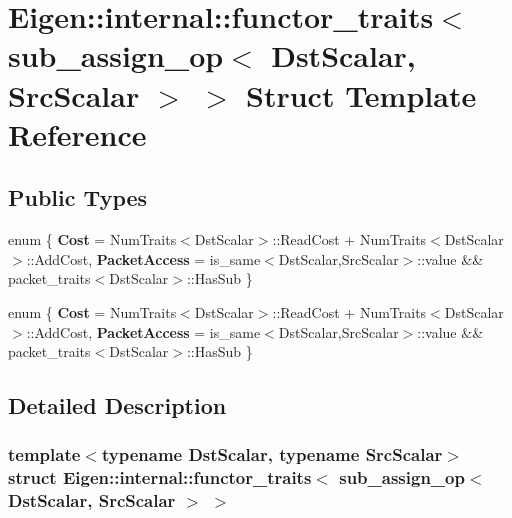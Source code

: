 \hypertarget{struct_eigen_1_1internal_1_1functor__traits_3_01sub__assign__op_3_01_dst_scalar_00_01_src_scalar_01_4_01_4}{}\section{Eigen\+:\+:internal\+:\+:functor\+\_\+traits$<$ sub\+\_\+assign\+\_\+op$<$ Dst\+Scalar, Src\+Scalar $>$ $>$ Struct Template Reference}
\label{struct_eigen_1_1internal_1_1functor__traits_3_01sub__assign__op_3_01_dst_scalar_00_01_src_scalar_01_4_01_4}
\subsection*{Public Types}
\begin{DoxyCompactItemize}
\item 
\mbox{\label{struct_eigen_1_1internal_1_1functor__traits_3_01sub__assign__op_3_01_dst_scalar_00_01_src_scalar_01_4_01_4_a765a81f91d21667f6bb16c7ce2a338ab}} 
enum \{ {\bfseries Cost} = Num\+Traits$<$Dst\+Scalar$>$\+:\+:Read\+Cost + Num\+Traits$<$Dst\+Scalar$>$\+:\+:Add\+Cost, 
{\bfseries Packet\+Access} = is\+\_\+same$<$Dst\+Scalar,Src\+Scalar$>$\+:\+:value \&\& packet\+\_\+traits$<$Dst\+Scalar$>$\+:\+:Has\+Sub
 \}
\item 
\mbox{\label{struct_eigen_1_1internal_1_1functor__traits_3_01sub__assign__op_3_01_dst_scalar_00_01_src_scalar_01_4_01_4_a4216eff6941d2e824ca91f11f4c5d14e}} 
enum \{ {\bfseries Cost} = Num\+Traits$<$Dst\+Scalar$>$\+:\+:Read\+Cost + Num\+Traits$<$Dst\+Scalar$>$\+:\+:Add\+Cost, 
{\bfseries Packet\+Access} = is\+\_\+same$<$Dst\+Scalar,Src\+Scalar$>$\+:\+:value \&\& packet\+\_\+traits$<$Dst\+Scalar$>$\+:\+:Has\+Sub
 \}
\end{DoxyCompactItemize}


\subsection{Detailed Description}
\subsubsection*{template$<$typename Dst\+Scalar, typename Src\+Scalar$>$\newline
struct Eigen\+::internal\+::functor\+\_\+traits$<$ sub\+\_\+assign\+\_\+op$<$ Dst\+Scalar, Src\+Scalar $>$ $>$}




